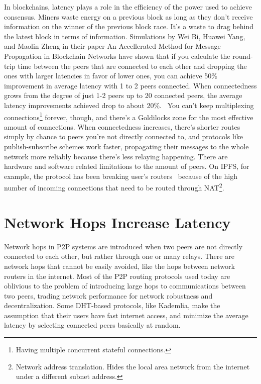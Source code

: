 In blockchains, latency plays a role in the efficiency of the power used to achieve consensus. Miners waste energy on a previous block as long as they don't receive information on the winner of the previous block race. It's a waste to drag behind the latest block in terms of information. Simulations by Wei Bi, Huawei Yang, and Maolin Zheng in their paper An Accellerated Method for Message Propagation in Blockchain Networks have shown that if you calculate the round-trip time between the peers that are connected to each other and dropping the ones with larger latencies in favor of lower ones, you can achieve 50\% improvement in average latency with 1 to 2 peers connected. When connectedness grows from the degree of just 1-2 peers up to 20 connected peers, the average latency improvements achieved drop to about 20\%.~\cite{Bi_undated-is} You can't keep multiplexing connections\footnote{Having multiple concurrent stateful connections.} forever, though, and there's a Goldilocks zone for the most effective amount of connections. When connectedness increases, there's shorter routes simply by chance to peers you're not directly connected to, and protocols like publish-subscribe schemes work faster, propagating their messages to the whole network more reliably because there's less relaying happening. There are hardware and software related limitations to the amount of peers. On IPFS, for example, the protocol has been breaking user's routers~\cite{Whyrusleeping2016-ej} because of the high number of incoming connections that need to be routed through NAT\footnote{Network address translation. Hides the local area network from the internet under a different subnet address.}.

\section{Network Hops Increase Latency}
Network hops in P2P systems are introduced when two peers are not directly connected to each other, but rather through one or many relays. There are network hops that cannot be easily avoided, like the hops between network routers in the internet. Most of the P2P routing protocols used today are oblivious to the problem of introducing large hops to communications between two peers, trading network performance for network robustness and decentralization. Some DHT-based protocols, like Kademlia, make the assumption that their users have fast internet access, and minimize the average latency by selecting connected peers basically at random.

